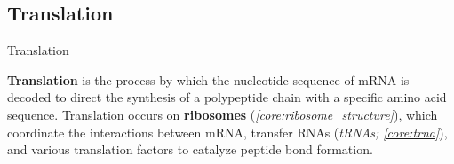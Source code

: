 \documentclass[10pt]{article}
\begin{document}
  \subsection{Translation}

    \begin{core}[label=core:translation]{Translation}

      \textbf{Translation} is the process by which the nucleotide sequence of mRNA is decoded to direct the synthesis of a polypeptide chain with a specific amino acid sequence. Translation occurs on \textbf{ribosomes} (\textit{\autoref{core:ribosome_structure}}), which coordinate the interactions between mRNA, transfer RNAs (\textit{tRNAs; \autoref{core:trna}}), and various translation factors to catalyze peptide bond formation.

    \end{core}
\end{document}

